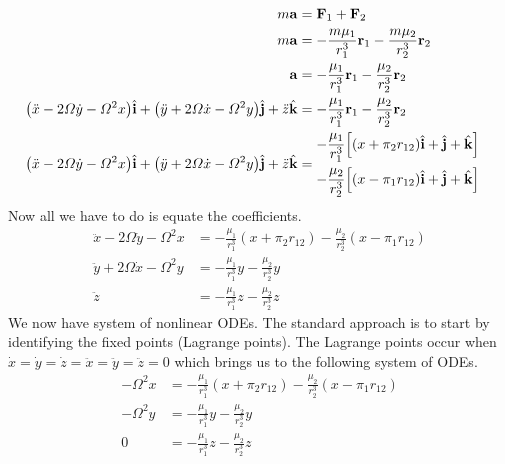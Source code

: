 \begin{align} 
  m\mathbf{a} & = \mathbf{F}_1 + \mathbf{F}_2 & \notag\\
  m\mathbf{a} & = -\frac{m\mu_1}{r_1^3}\mathbf{r}_1
                - \frac{m\mu_2}{r_2^3}\mathbf{r}_2 & \notag\\
  \mathbf{a} & = -\frac{\mu_1}{r_1^3}\mathbf{r}_1
               - \frac{\mu_2}{r_2^3}\mathbf{r}_2 & \notag\\
  \bigl(\ddot{x} - 2\varOmega\dot{y} - \varOmega^2x\bigr)\hat{\mathbf{i}}
  + \bigl(\ddot{y} + 2\varOmega\dot{x} - \varOmega^2y\bigr)\hat{\mathbf{j}}
  + \ddot{z}\hat{\mathbf{k}}
              & = -\frac{\mu_1}{r_1^3}\mathbf{r}_1
                - \frac{\mu_2}{r_2^3}\mathbf{r}_2 & \notag\\
  \bigl(\ddot{x} - 2\varOmega\dot{y} - \varOmega^2x\bigr)\hat{\mathbf{i}}
  + \bigl(\ddot{y} + 2\varOmega\dot{x} - \varOmega^2y\bigr)\hat{\mathbf{j}}
  + \ddot{z}\hat{\mathbf{k}}
              & =
                \begin{aligned}
                  - & \frac{\mu_1}{r_1^3}\Bigl[(x +
                  \pi_2r_{12})\hat{\mathbf{i}} + \hat{\mathbf{j}} +
                  \hat{\mathbf{k}}\Bigr]\\
                  - & \frac{\mu_2}{r_2^3}\Bigl[(x -
                  \pi_1r_{12})\hat{\mathbf{i}} + \hat{\mathbf{j}} +
                  \hat{\mathbf{k}}\Bigr]
                \end{aligned}\label{absaccelfurthersolved}
\end{align}
Now all we have to do is equate the coefficients.
\begin{align}
  \ddot{x} - 2\varOmega\dot{y} - \varOmega^2x
  & = -\frac{\mu_1}{r_1^3}(x + \pi_2r_{12}) - \frac{\mu_2}{r_2^3}(x
    - \pi_1r_{12})\\
  \ddot{y} + 2\varOmega\dot{x} - \varOmega^2y
  & = -\frac{\mu_1}{r_1^3}y - \frac{\mu_2}{r_2^3}y\\
  \ddot{z}
  & = -\frac{\mu_1}{r_1^3}z - \frac{\mu_2}{r_2^3}z
\end{align}
We now have system of nonlinear ODEs.
The standard approach is to start by identifying the fixed points (Lagrange
points).
The Lagrange points occur when
\(\dot{x} = \dot{y} = \dot{z} = \ddot{x} = \ddot{y} = \ddot{z} = 0\) which
brings us to the following system of ODEs.
\begin{align*}
  -\varOmega^2x & = -\frac{\mu_1}{r_1^3}(x + \pi_2r_{12}) -
                   \frac{\mu_2}{r_2^3}(x - \pi_1r_{12})\\
  -\varOmega^2y & = -\frac{\mu_1}{r_1^3}y - \frac{\mu_2}{r_2^3}y\\
  0 & = -\frac{\mu_1}{r_1^3}z - \frac{\mu_2}{r_2^3}z
\end{align*}

